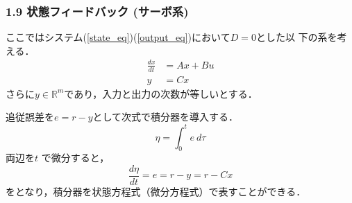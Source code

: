 \documentclass[10pt]{beamer}
\begin{document}
\begin{frame}[t]
\frametitle{1.9 状態フィードバック (サーボ系)}
ここではシステム(\ref{state_eq})(\ref{output_eq})において$D=0$とした以
下の系を考える．
\begin{align}
 \frac{dx}{dt} &= A x + B u  \\
 y             &= C x 
\end{align}
さらに$y \in \mathbb{R}^m$であり，入力と出力の次数が等しいとする．

追従誤差を$e=r-y$として次式で積分器を導入する．
\begin{equation}
 \eta = \int_0^t e \ d \tau
\end{equation}
両辺を$t$ で微分すると，
\begin{equation}
 \frac{d \eta}{dt} = e= r - y = r - Cx
\end{equation}
をとなり，積分器を状態方程式（微分方程式）で表すことができる．
\end{frame}
\end{document}
